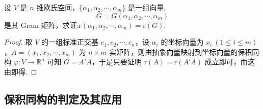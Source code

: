 \documentclass[../../main.tex]{subfiles}%
\begin{document}
\begin{proposition}\label{proposition:Gram阵的秩与其生成向量的秩相同-例9.33}
设 \(V\) 是 \(n\) 维欧氏空间，\(\{\alpha_1,\alpha_2,\cdots,\alpha_m\}\) 是一组向量,$$G = G(\alpha_1,\alpha_2,\cdots,\alpha_m)$$ 是其 Gram 矩阵，求证:$\mathrm{r}(\alpha_1,\alpha_2,\cdots,\alpha_m)=\mathrm{r}(G).$
\end{proposition}
\begin{proof}
取 \(V\) 的一组标准正交基 \(e_1,e_2,\cdots,e_n\)，设 \(\alpha_i\) 的坐标向量为 \(x_i\ (1\leqslant  i\leqslant  m)\)，\(A=(x_1,x_2,\cdots,x_m)\) 为 \(n\times m\) 实矩阵，则由抽象向量映射到坐标向量的保积同构 \(\varphi:V\rightarrow\mathbb{R}^n\) 可知 \(G = A'A\)，于是只要证明 \(\mathrm{r}(A)=\mathrm{r}(A'A)\) 成立即可，而这由即得.
\end{proof}


\subsection{保积同构的判定及其应用}
\end{document}
